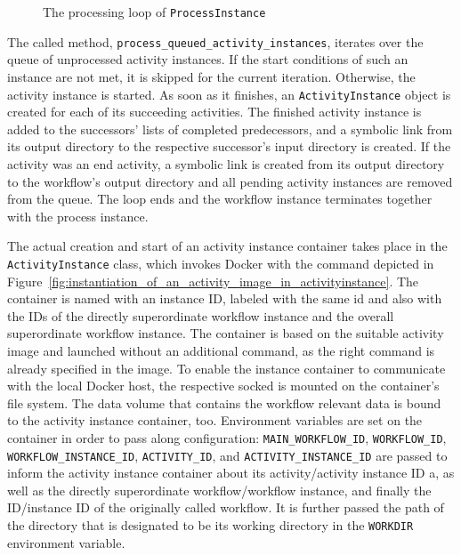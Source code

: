     \begin{figure}[h]
      \inputminted[firstline=26,lastline=43,fontsize=\footnotesize,linenos=true,numberblanklines=true,showspaces=false,breaklines=true,baselinestretch=1,gobble=2]{ruby}{../code/wf_base/process_instance.rb}
      \caption[The processing loop of ProcessInstance]{The processing loop of \texttt{ProcessInstance}}
      \label{fig:the_processing_loop_of_process_instance}
    \end{figure}

    The called method, \texttt{process\_queued\_activity\_instances}, iterates over the queue of unprocessed activity instances. If the start conditions of such an instance are not met, it is skipped for the current iteration. Otherwise, the activity instance is started. As soon as it finishes, an \texttt{ActivityInstance} object is created for each of its succeeding activities. The finished activity instance is added to the successors' lists of completed predecessors, and a symbolic link from its output directory to the respective successor's input directory is created. If the activity was an end activity, a symbolic link is created from its output directory to the workflow's output directory and all pending activity instances are removed from the queue. The loop ends and the workflow instance terminates together with the process instance.

    The actual creation and start of an activity instance container takes place in the \texttt{ActivityInstance} class, which invokes Docker with the command depicted in Figure~\ref{fig:instantiation_of_an_activity_image_in_activityinstance}. The container is named with an instance \ac{ID}, labeled with the same id and also with the \acp{ID} of the directly superordinate workflow instance and the overall superordinate workflow instance. The container is based on the suitable activity image and launched without an additional command, as the right command is already specified in the image. To enable the instance container to communicate with the local Docker host, the respective socked is mounted on the container's file system. The data volume that contains the workflow relevant data is bound to the activity instance container, too. Environment variables are set on the container in order to pass along configuration: \texttt{MAIN\_WORKFLOW\_ID}, \texttt{WORKFLOW\_ID}, \texttt{WORKFLOW\_INSTANCE\_ID}, \texttt{ACTIVITY\_ID}, and \texttt{ACTIVITY\_INSTANCE\_ID} are passed to inform the activity instance container about its activity/activity instance \ac{ID} a, as well as the directly superordinate workflow/workflow instance, and finally the \ac{ID}/instance \ac{ID} of the originally called workflow. It is further passed the path of the directory that is designated to be its working directory in the \texttt{WORKDIR} environment variable.

